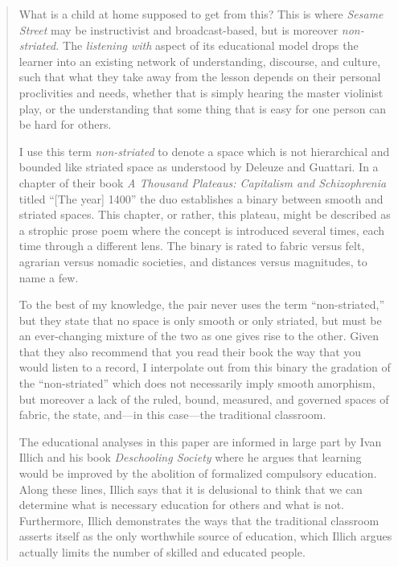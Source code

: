 \documentclass[12pt,letterpaper]{article}
\begin{document}
\begin{quote}
	What is a child at home supposed to get from this? This is where 
	\textit{Sesame Street} may be instructivist and broadcast-based, but 
	is moreover \textit{non-striated.} The \textit{listening with} aspect of
	its 
	educational model drops the learner into an existing network of 
	understanding, discourse, and culture, such that what they take away
	from the lesson depends on their personal proclivities and needs, 
	whether that is simply hearing the master violinist play, or the 
	understanding that some thing that is easy for one person can be hard 
	for others.

	I use this term \textit{non-striated} to denote a space which is not
	hierarchical and bounded like striated space as understood by Deleuze 
	and Guattari. In a chapter of their book \textit{A Thousand Plateaus: 
	Capitalism and Schizophrenia} titled ``[The year] 1400'' the duo 
	establishes a binary between smooth and striated spaces. This chapter, 
	or rather, this
	plateau, might be described as a strophic prose poem where the concept 
	is introduced several times, each time through a different lens. The 
	binary 
	is rated to fabric versus felt,	agrarian versus nomadic societies, and 
	distances versus magnitudes, to name a few.   

	To the best of my knowledge, the pair never uses the term 
	``non-striated,'' but they state that no space is only smooth or 
	only striated, but must be an ever-changing mixture of the two as one 
	gives rise to the other.\autocite[474]{Deleuze} Given that they also 
	recommend that you read their book the way that you would listen to a 
	record,\autocite[ix]{Deleuze} I interpolate out from this binary the 
	gradation of the ``non-striated'' which does not necessarily 
	imply smooth amorphism, but moreover a lack of the ruled, bound, 
	measured, and governed spaces of fabric, the state, and---in this 
	case---the traditional classroom.       

	The educational analyses in this paper are informed in large part by 
	Ivan Illich and his book \textit{Deschooling Society} where he argues
	that learning would be improved by the abolition of formalized
	compulsory education. Along these lines, Illich says that it is 
	delusional to think that we can determine what is necessary education 
	for others and what is not.\autocite[12]{Illich} Furthermore, Illich 
	demonstrates the ways that the traditional classroom asserts itself as
	the only worthwhile source of education, which Illich argues actually 
	limits the number of skilled and educated people.\autocite[39]{Illich} 
		

\end{quote}
\end{document}

